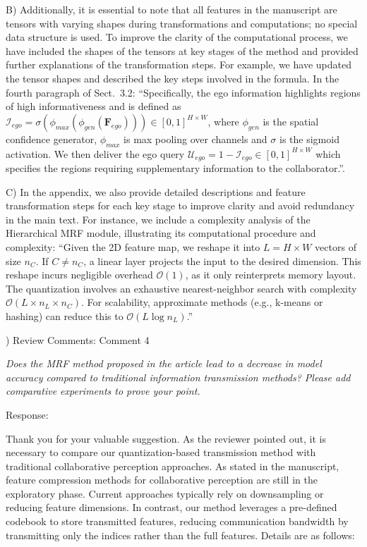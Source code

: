 \documentclass[12pt,a4paper]{article}
\begin{document}
B) Additionally, it is essential to note that all features in the manuscript are tensors with varying shapes during transformations and computations; no special data structure is used. To improve the clarity of the computational process, we have included the shapes of the tensors at key stages of the method and provided further explanations of the transformation steps. For example, we have updated the tensor shapes and described the key steps involved in the formula. In the fourth paragraph of Sect.~3.2: ``Specifically, the ego information highlights regions of high informativeness and is defined as $\mathcal{I}_{ego}=\sigma (\phi_{max}(\phi_{gen}(\mathbf{F}_{ego}))) \in [0,1]^{H\times W}$, where $\phi_{gen}$ is the spatial confidence generator, $\phi_{max}$ is max pooling over channels and $\sigma$ is the sigmoid activation. We then deliver the ego query $\mathcal{U}_{ego} = 1-\mathcal{I}_{ego}\in[0,1]^{H\times W}$ which specifies the regions requiring supplementary information to the collaborator.''. 

C) In the appendix, we also provide detailed descriptions and feature transformation steps for each key stage to improve clarity and avoid redundancy in the main text. 
For instance, we include a complexity analysis of the Hierarchical MRF module, illustrating its computational procedure and complexity: ``Given the 2D feature map, we reshape it into $L = H \times W$ vectors of size $n_C$. If $C \ne n_C$, a linear layer projects the input to the desired dimension. This reshape incurs negligible overhead $\mathcal{O}(1)$, as it only reinterprets memory layout. The quantization involves an exhaustive nearest-neighbor search with complexity $\mathcal{O}(L \times n_L \times n_C)$. For scalability, approximate methods (e.g., k-means or hashing) can reduce this to $\mathcal{O}(L \log n_L)$.''





\vspace{4ex}
) Review Comments: Comment 4

\textit{Does the MRF method proposed in the article lead to a decrease in model accuracy compared to traditional information transmission methods? Please add comparative experiments to prove your point.}

\noindent Response:

Thank you for your valuable suggestion. As the reviewer pointed out, it is necessary to compare our quantization-based transmission method with traditional collaborative perception approaches.
As stated in the manuscript, feature compression methods for collaborative perception are still in the exploratory phase. Current approaches typically rely on downsampling or reducing feature dimensions. In contrast, our method leverages a pre-defined codebook to store transmitted features, reducing communication bandwidth by transmitting only the indices rather than the full features.
Details are as follows:
\end{document}

